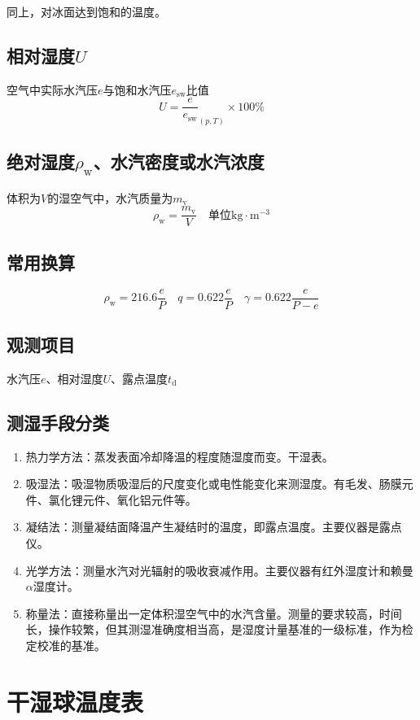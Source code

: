 \documentclass[UTF8,11pt]{ctexbook}
\begin{document}
同上，对冰面达到饱和的温度。

\subsection{相对湿度\(U\)}

空气中实际水汽压\(e\)与饱和水汽压\(e_\mathrm{sw}\)比值
\[
U=\frac{e}{e_\mathrm{sw}}_{(p,T)}\times100\%
\]

\subsection{绝对湿度\(\rho_\mathrm{w}\)、水汽密度或水汽浓度}

体积为\(V\)的湿空气中，水汽质量为\(m_\mathrm{v}\)
\[
\rho_\mathrm{w}=\frac{m_\mathrm{v}}{V}\quad\text{单位}\mathrm{kg\cdot m^{-3}}
\]

\subsection{常用换算}
\[
\rho_\mathrm{w}=216.6\frac{e}{P}\quad q=0.622\frac{e}{P}\quad\gamma=0.622\frac{e}{P-e}
\]

\subsection{观测项目}

水汽压\(e\)、相对湿度\(U\)、露点温度\(t_\mathrm{d}\)

\subsection{测湿手段分类}
\begin{enumerate}
    \item 热力学方法：蒸发表面冷却降温的程度随湿度而变。干湿表。
    \item 吸湿法：吸湿物质吸湿后的尺度变化或电性能变化来测湿度。有毛发、肠膜元件、氯化锂元件、氧化铝元件等。
    \item 凝结法：测量凝结面降温产生凝结时的温度，即露点温度。主要仪器是露点仪。
    \item 光学方法：测量水汽对光辐射的吸收衰减作用。主要仪器有红外湿度计和赖曼\(\alpha\)湿度计。
    \item 称量法：直接称量出一定体积湿空气中的水汽含量。测量的要求较高，时间长，操作较繁，但其测湿准确度相当高，是湿度计量基准的一级标准，作为检定校准的基准。
\end{enumerate}

\section{干湿球温度表}
\end{document}
